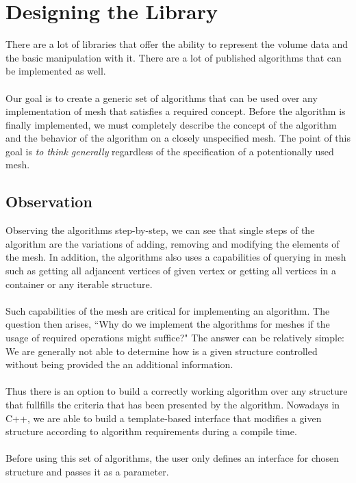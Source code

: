 \chapter{Designing the Library}

There are a lot of libraries that offer the ability to represent the volume data
and the basic manipulation with it. There are a lot of published algorithms
that can be implemented as well.\\
\\
Our goal is to create a generic set of algorithms that can be used over any implementation
of mesh that satisfies a required concept. Before the algorithm is finally implemented,
we must completely describe the concept of the algorithm and the behavior of the algorithm
on a closely unspecified mesh. The point of this goal is \emph{to think generally} regardless of
the specification of a potentionally used mesh.\\

\section{Observation}

Observing the algorithms step-by-step, we can see that single steps
of the algorithm are the variations of adding, removing and modifying the elements
of the mesh. In addition, the algorithms also uses a capabilities of querying
in mesh such as getting all adjancent vertices of given vertex or getting all
vertices in a container or any iterable structure.\\
\\
Such capabilities of the mesh are critical for implementing an algorithm.
The question then arises, ``Why do we implement the algorithms for meshes if
the usage of required operations might suffice?" The answer can be relatively simple:
We are generally not able to determine how is a given structure controlled
without being provided the an additional information.\\
\\
Thus there is an option to build a correctly working algorithm over any structure
that fullfills the criteria that has been presented by the algorithm. Nowadays in C++,
we are able to build a template-based interface that modifies a given structure according
to algorithm requirements during a compile time.\\
\\
Before using this set of algorithms, the user only defines an interface for chosen structure
and passes it as a parameter.


